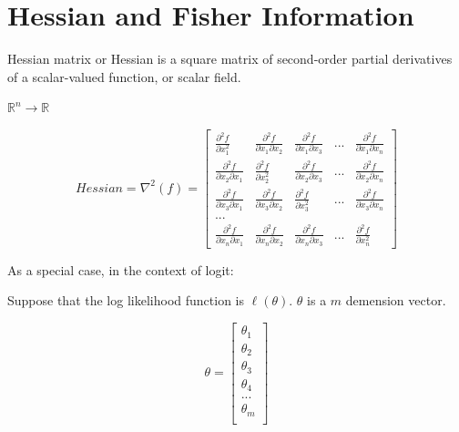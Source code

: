 \documentclass[]{book}
\begin{document}
\section{Hessian and Fisher
Information}\label{hessian-and-fisher-information}

Hessian matrix or Hessian is a square matrix of second-order partial
derivatives of a scalar-valued function, or scalar field.

\(\mathbb{R}^n \rightarrow \mathbb{R}\)

\[Hessian=\nabla ^2(f) =\begin{bmatrix}
\frac{\partial^2 f}{\partial x_1^2} & \frac{\partial^2 f}{\partial x_1 \partial x_2} & \frac{\partial^2 f}{\partial x_1 \partial x_3} & ... & \frac{\partial^2 f}{\partial x_1 \partial x_n}\\
\frac{\partial^2 f}{\partial x_2 \partial x_1} & \frac{\partial^2 f}{\partial x_2^2} & \frac{\partial^2 f}{\partial x_2 \partial x_3} & ... & \frac{\partial^2 f}{\partial x_2 \partial x_n} \\
\frac{\partial^2 f}{\partial x_3 \partial x_1} & \frac{\partial^2 f}{\partial x_3 \partial x_2} & \frac{\partial^2 f}{\partial x_3^2} & ... & \frac{\partial^2 f}{\partial x_3 \partial x_n} \\
...\\
\frac{\partial^2 f}{\partial x_n \partial x_1} & \frac{\partial^2 f}{\partial x_n \partial x_2} & \frac{\partial^2 f}{\partial x_n \partial x_3} & ... & \frac{\partial^2 f}{\partial x_n^2}
\end{bmatrix}\]

As a special case, in the context of logit:

Suppose that the log likelihood function is \(\ell (\theta)\).
\(\theta\) is a \(m\) demension vector.

\[ \theta = \begin{bmatrix}\theta_1 \\
\theta_2 \\
\theta_3 \\
\theta_4 \\
...\\
\theta_m \\
\end{bmatrix}\]
\end{document}
